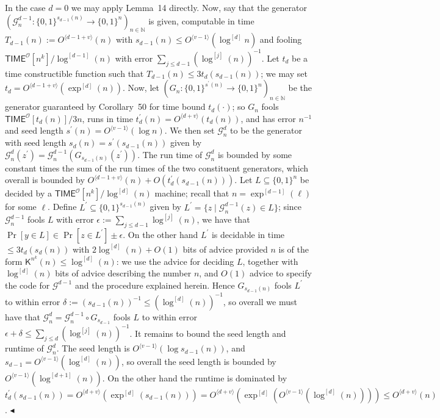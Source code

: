 In the case $d=0$ we may apply Lemma 14 directly. Now, say that the generator $(\mathcal{G}^{d-1}_{n}:\{0,1\}^{s_{d-1}(n)}\to\{0,1\}^{n})_{n\in\mathbb{N}}$ is given, computable in time $T_{d-1}(n):=O^{\langle d-1+v\rangle}(n)$ with $s_{d-1}(n)\leq O^{\langle v-1\rangle}(\log^{[d]}n)$ and fooling ${\mathsf{TIME}}^{\mathcal{O}}[n^{k}]/\log^{[d-1]}(n)$ with error $\sum_{j\leq d-1}(\log^{[j]}(n))^{-1}$. Let $t_{d}$ be a time constructible function such that $T_{d-1}(n)\leq 3t_{d}(s_{d-1}(n))$; we may set $t_{d}=O^{\langle d-1+v\rangle}(\exp^{[d]}(n))$. Now, let $(G_{n}:\{0,1\}^{s^{\prime}(n)}\to\{0,1\}^{n})_{n\in\mathbb{N}}$ be the generator guaranteed by Corollary 50 for time bound $t_{d}(\cdot)$; so $G_{n}$ fools ${\mathsf{TIME}}^{\mathcal{O}}[t_{d}(n)]/3n$, runs in time $t^{\prime}_{d}(n)=O^{\langle d+v\rangle}(t_{d}(n))$, and has error $n^{-1}$ and seed length $s^{\prime}(n)=O^{\langle v-1\rangle}(\log n)$. We then set $\mathcal{G}^{d}_{n}$ to be the generator with seed length $s_{d}(n)=s^{\prime}(s_{d-1}(n))$ given by $\mathcal{G}^{d}_{n}(z^{\prime})=\mathcal{G}_{n}^{d-1}(G_{s_{d-1}(n)}(z^{\prime}))$. The run time of $\mathcal{G}^{d}_{n}$ is bounded by some constant times the sum of the run times of the two constituent generators, which overall is bounded by $O^{\langle d-1+v\rangle}(n)+O(t^{\prime}_{d}(s_{d-1}(n)))$. Let $L\subseteq\{0,1\}^{n}$ be decided by a ${\mathsf{TIME}}^{\mathcal{O}}[n^{k}]/\log^{[d]}(n)$ machine; recall that $n=\exp^{[d-1]}(\ell)$ for some $\ell$. Define $L^{\prime}\subseteq\{0,1\}^{s_{d-1}(n)}$ given by $L^{\prime}=\{z\mid\mathcal{G}^{d-1}_{n}(z)\in L\}$; since $\mathcal{G}^{d-1}_{n}$ fools $L$ with error $\epsilon:=\sum_{j\leq d-1}\log^{[j]}(n)$, we have that $\Pr[y\in L]\in\Pr[z\in L^{\prime}]\pm\epsilon$. On the other hand $L^{\prime}$ is decidable in time $\leq 3t_{d}(s_{d}(n))$ with $2\log^{[d]}(n)+O(1)$ bits of advice provided $n$ is of the form ${\mathsf{K}}^{n^{k}}(n)\leq\log^{[d]}(n)$: we use the advice for deciding $L$, together with $\log^{[d]}(n)$ bits of advice describing the number $n$, and $O(1)$ advice to specify the code for $\mathcal{G}^{d-1}$ and the procedure explained herein. Hence $G_{s_{d-1}(n)}$ fools $L^{\prime}$ to within error $\delta:=(s_{d-1}(n))^{-1}\leq(\log^{[d]}(n))^{-1}$, so overall we must have that $\mathcal{G}^{d}_{n}=\mathcal{G}^{d-1}_{n}\circ G_{s_{d-1}}$ fools $L$ to within error $\epsilon+\delta\leq\sum_{j\leq d}(\log^{[j]}(n))^{-1}$. It remains to bound the seed length and runtime of $\mathcal{G}^{d}_{n}$. The seed length is $O^{\langle v-1\rangle}(\log s_{d-1}(n))$, and $s_{d-1}=O^{\langle v-1\rangle}(\log^{[d]}(n))$, so overall the seed length is bounded by $O^{\langle v-1\rangle}(\log^{[d+1]}(n))$. On the other hand the runtime is dominated by $t^{\prime}_{d}(s_{d-1}(n))=O^{\langle d+v\rangle}(\exp^{[d]}(s_{d-1}(n)))=O^{\langle d+v\rangle}(\exp^{[d]}(O^{\langle v-1\rangle}(\log^{[d]}(n))))\leq O^{\langle d+v\rangle}(n)$.
$\blacktriangleleft$
\par



